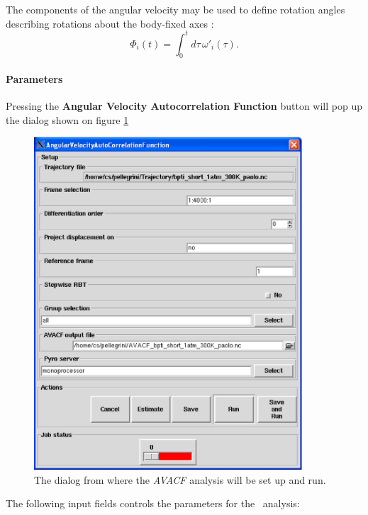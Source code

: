 \documentclass[a4paper,11pt]{report}
\begin{document}
The components of the angular velocity may be used to define rotation angles describing rotations about the body-fixed axes
\cite{Smith:1992}:
\begin{equation}
\label{phi_omega}
\Phi_i(t) = \int_0^t d\tau\,\omega'_i(\tau).
\end{equation}

\paragraph{Parameters\\}
\label{avacf_parameters}
Pressing the \textbf{Angular Velocity Autocorrelation Function} button will pop up the dialog shown on figure \ref{fig:avacf}
\begin{figure}[h!]
\begin{center}
\includegraphics[width=10cm]{Figures/avacf.eps}
\end{center}
\caption[The \textit{AVACF} analysis dialog]{The dialog from where the \textit{AVACF} analysis will be set up and run.}
\label{fig:avacf}
\end{figure}   

The following input fields controls the parameters for the \AVACF\ analysis:
\end{document}
